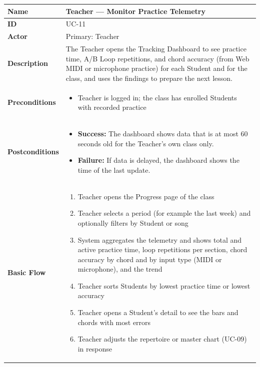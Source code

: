 \documentclass[a4paper]{article}
\newlength{\ucLeft}
\begin{document}
\begin{longtable}{|>{\bfseries}p{\ucLeft}|p{\dimexpr\linewidth-\ucLeft-2\tabcolsep-2\arrayrulewidth}|}
\hline
Name & Teacher --- Monitor Practice Telemetry \\ \hline
ID & UC-11 \\ \hline
Actor & Primary: Teacher \\ \hline
Description & The Teacher opens the Tracking Dashboard to see practice time, A/B Loop repetitions, and chord accuracy (from Web MIDI or microphone practice) for each Student and for the class, and uses the findings to prepare the next lesson. \\ \hline
Preconditions &
\begin{itemize}[leftmargin=1em, nosep, topsep=2pt, partopsep=0pt, parsep=0pt, after=\strut]
    \item Teacher is logged in; the class has enrolled Students with recorded practice
\end{itemize}
\\ \hline
Postconditions &
\begin{itemize}[leftmargin=1em, nosep, topsep=2pt, partopsep=0pt, parsep=0pt, after=\strut]
    \item \textbf{Success:} The dashboard shows data that is at most 60 seconds old for the Teacher's own class only.
    \item \textbf{Failure:} If data is delayed, the dashboard shows the time of the last update.
\end{itemize}
\\ \hline
Basic Flow &
\begin{enumerate}[leftmargin=1.5em, nosep, topsep=2pt, partopsep=0pt, parsep=0pt, after=\strut]
    \item Teacher opens the Progress page of the class
    \item Teacher selects a period (for example the last week) and optionally filters by Student or song
    \item System aggregates the telemetry and shows total and active practice time, loop repetitions per section, chord accuracy by chord and by input type (MIDI or microphone), and the trend
    \item Teacher sorts Students by lowest practice time or lowest accuracy
    \item Teacher opens a Student's detail to see the bars and chords with most errors
    \item Teacher adjusts the repertoire or master chart (UC-09) in response
\end{enumerate}

\end{longtable}
\end{document}
